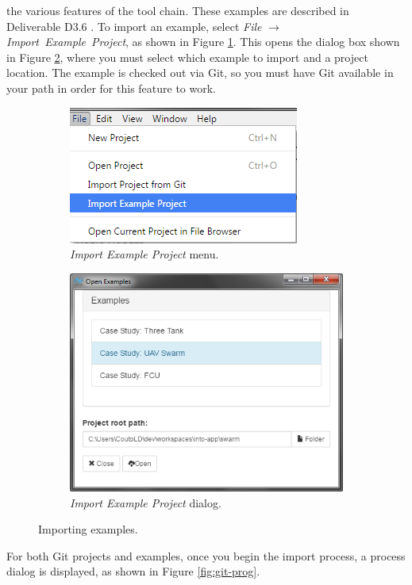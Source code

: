 the various features of the \into tool chain. These examples
are described in Deliverable D3.6 \cite{INTOCPSD3.6}. To import an example, select
\textit{File} $\rightarrow$ \emph{Im\-port\ Ex\-amp\-le\ Pro\-ject}, as shown in Figure \ref{fig:example-menu}.
This opens the dialog box shown in Figure \ref{fig:example-diag}, where you 
must select which example to import and a project location. The example
is checked out via Git, so you must have Git available in your path in order
for this feature to work.
%
%
%
\begin{figure}[h!]
\centering
\begin{subfigure}[b]{0.45\textwidth}
  \includegraphics[width=\textwidth]{figures/app/example-menu}
  \caption{\emph{Import Example Project} menu.}
  \label{fig:example-menu}
\end{subfigure}
\quad 
\begin{subfigure}[b]{0.45\textwidth}
  \includegraphics[width=\textwidth]{figures/app/example-diag}
  \caption{\emph{Import Example Project} dialog.} 
  \label{fig:example-diag}
\end{subfigure}
\caption{Importing examples.}
\label{fig:example}
\end{figure}
%
%
%
For both Git projects and examples, once you begin the import process,
a process dialog is displayed, as shown in Figure \ref{fig:git-prog}.

